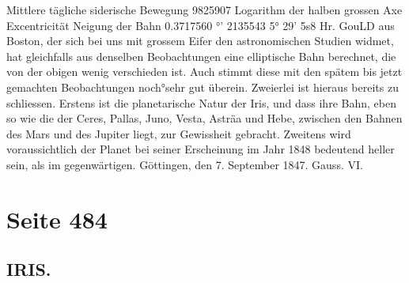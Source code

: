 \documentclass[10pt,a4paper]{article}
\begin{document}
Mittlere  tägliche  siderische  Bewegung
982\glqq{}5907
Logarithm  der  halben  grossen  Axe
Excentricität
Neigung  der  Bahn
0.3717560
°'  2135543
5°  29'    5s\glqq{}8
Hr.  GouLD  aus  Boston,  der  sich  bei  uns  mit  grossem  Eifer  den  astronomischen  Studien  widmet,
hat  gleichfalls  aus  denselben  Beobachtungen  eine  elliptische  Bahn  berechnet,  die  von  der  obigen  wenig
verschieden  ist.  Auch  stimmt  diese  mit  den  spätem  bis  jetzt  gemachten  Beobachtungen  noch°sehr  gut
überein.
Zweierlei  ist  hieraus  bereits  zu  schliessen.  Erstens  ist  die  planetarische  Natur  der  Iris,  und  dass
ihre  Bahn,  eben  so  wie  die  der  Ceres,  Pallas,  Juno,  Vesta,  Asträa  und  Hebe,  zwischen  den  Bahnen
des  Mars  und  des  Jupiter  liegt,  zur  Gewissheit  gebracht.  Zweitens  wird  voraussichtlich  der  Planet  bei
seiner  Erscheinung  im  Jahr  1848  bedeutend  heller  sein,  als  im  gegenwärtigen.
Göttingen,  den  7.  September  1847.  Gauss.
VI.

\newpage
\section*{Seite 484}

\subsection*{IRIS.}
\end{document}
